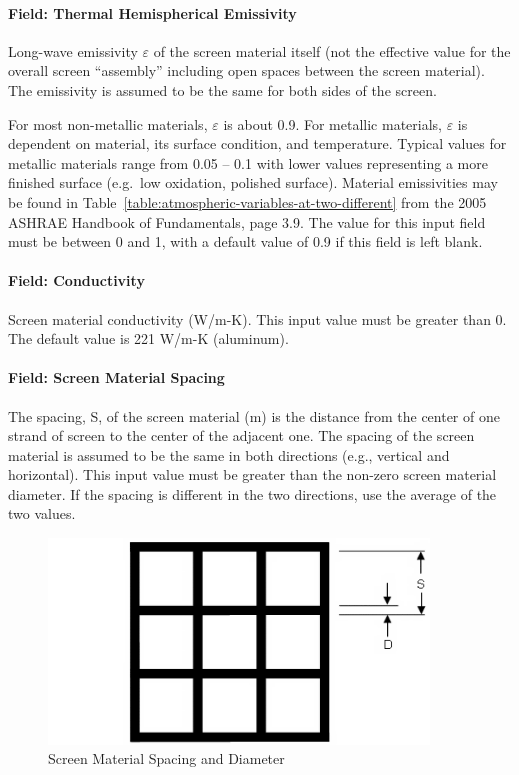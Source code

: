 \paragraph{Field: Thermal Hemispherical Emissivity}\label{field-thermal-hemispherical-emissivity-1}

Long-wave emissivity \(\varepsilon\) of the screen material itself (not the effective value for the overall screen ``assembly'' including open spaces between the screen material). The emissivity is assumed to be the same for both sides of the screen.

For most non-metallic materials, \(\varepsilon\) is about 0.9. For metallic materials, \(\varepsilon\) is dependent on material, its surface condition, and temperature. Typical values for metallic materials range from 0.05 -- 0.1 with lower values representing a more finished surface (e.g.~low oxidation, polished surface). Material emissivities may be found in Table~\ref{table:atmospheric-variables-at-two-different} from the 2005 ASHRAE Handbook of Fundamentals, page 3.9. The value for this input field must be between 0 and 1, with a default value of 0.9 if this field is left blank.

\paragraph{Field: Conductivity}\label{field-conductivity-5}

Screen material conductivity (W/m-K). This input value must be greater than 0. The default value is 221 W/m-K (aluminum).

\paragraph{Field: Screen Material Spacing}\label{field-screen-material-spacing}

The spacing, S, of the screen material (m) is the distance from the center of one strand of screen to the center of the adjacent one. The spacing of the screen material is assumed to be the same in both directions (e.g., vertical and horizontal). This input value must be greater than the non-zero screen material diameter. If the spacing is different in the two directions, use the average of the two values.

\begin{figure}[hbtp] %
\centering
\includegraphics[width=0.9\textwidth, height=0.9\textheight, keepaspectratio=true]{media/image044.png}
\caption{Screen Material Spacing and Diameter \protect \label{fig:screen-material-spacing-and-diameter}}
\end{figure}

